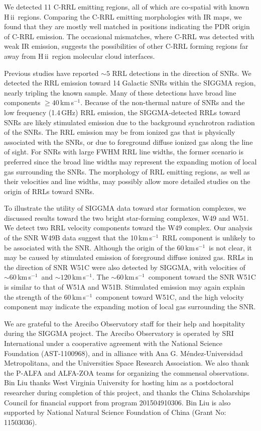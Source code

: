 \documentclass[manuscript]{aastex61}
\newcommand{\hii}{{\rm H\,}{{\sc ii}}}
\newcommand{\kms}{\,km\,s$^{-1}$}
\newcommand{\ghz}{\,GHz}
\begin{document}
We detected 11 C-RRL emitting regions, all of which are co-spatial with known \hii\ regions.
Comparing the C-RRL emitting morphologies with IR maps, we found that they are mostly well matched in positions indicating the PDR origin of C-RRL emission.
The occasional mismatches, where C-RRL was detected with weak IR emission, suggests the possibilities of other C-RRL forming regions far away from \hii\ region molecular cloud interfaces.

Previous studies have reported $\sim5$ RRL detections in the direction of SNRs. 
We detected the RRL emission toward 14 Galactic SNRs within the SIGGMA region, nearly tripling the known sample.
Many of these detections have broad line components $\geq 40$\kms.
Because of the non-thermal nature of SNRs and the low frequency (1.4\ghz) RRL emission, the SIGGMA-detected RRLs toward SNRs are likely stimulated emission due to the background synchrotron radiation of the SNRs.
The RRL emission may be from ionized gas that is physically associated with the SNRs, or due to foreground diffuse ionized gas along the line of sight.
For SNRs with large FWHM RRL line widths, the former scenario is preferred since the broad line widths may represent the expanding motion of local gas surrounding the SNRs.
The morphology of RRL emitting regions, as well as their velocities and line widths, may possibly allow more detailed studies on the origin of RRLs toward SNRs.

To illustrate the utility of SIGGMA data toward star formation complexes, we discussed results toward the two bright star-forming complexes, W49 and W51.
We detect two RRL velocity components toward the W49 complex.  Our analysis of the SNR W49B data suggest that the 10\kms\ RRL component is unlikely to be associated with the SNR.
Although the origin of the 60\kms\ is not clear, it may be caused by stimulated emission of foreground diffuse ionized gas.
RRLs in the direction of SNR W51C were also detected by SIGGMA, with velocities of $\sim60$\kms\ and $\sim120$\kms.
The $\sim60$\kms\ component toward the SNR W51C is similar to that of W51A and W51B.
Stimulated emission may again explain the strength of the 60\kms\ component toward W51C, and
the high velocity component may indicate the expanding motion of local gas surrounding the SNR.

\acknowledgments
We are grateful to the Arecibo Observatory staff for their help and hospitality
during the SIGGMA project. The Arecibo Observatory is operated by SRI
International under a cooperative agreement with the National Science
Foundation (AST-1100968), and in alliance with Ana G. M\'endez-Universidad Metropolitana, and the Universities Space Research Association.
We also thank the P-ALFA and ALFA-ZOA teams for organizing the commensal observations. 
Bin Liu thanks West Virginia University for hosting him as a postdoctoral researcher during completion of this project, and thanks the China Scholarships Council for financial support from program 201504910306. Bin Liu is also supported by National Natural Science Foundation of China (Grant No: 11503036).
\end{document}
